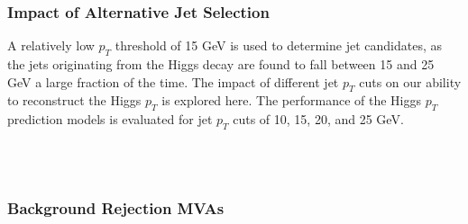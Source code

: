 \subsubsection{Impact of Alternative Jet Selection}
\label{subsec:ptCutApx}

A relatively low $p_T$ threshold of 15 GeV is used to determine jet candidates, as the jets originating from the Higgs decay are found to fall between 15 and 25 GeV a large fraction of the time. The impact of different jet $p_T$ cuts on our ability to reconstruct the Higgs $p_T$ is explored here. The performance of the Higgs $p_T$ prediction models is evaluated for jet $p_T$ cuts of 10, 15, 20, and 25 GeV.

\begin{figure}[h!]
    \\           
    \\                       
    \caption{}
    \label{fig:pt2lSS_20}
\end{figure} 


\subsubsection{Background Rejection MVAs}
\label{subsec:sigBkgApx}



